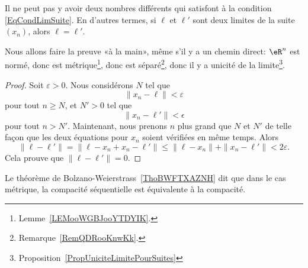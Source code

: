 \begin{lemma}
	Il ne peut pas y avoir deux nombres différents qui satisfont à la condition \eqref{EqCondLimSuite}. En d'autres termes, si $\ell$ et $\ell'$ sont deux limites de la suite $(x_n)$, alors $\ell=\ell'$.
\end{lemma}
Nous allons faire la preuve «à la main», même s'il y a un chemin direct: $\eR^n$ est normé, donc est métrique\footnote{Lemme~\ref{LEMooWGBJooYTDYIK}.}, donc est séparé\footnote{Remarque~\ref{RemQDRooKnwKk}.}, donc il y a unicité de la limite\footnote{Proposition~\ref{PropUniciteLimitePourSuites}}.
\begin{proof}
	Soit $\varepsilon>0$. Nous considérons $N$ tel que
	\begin{equation}
		\| x_n-\ell \|<\varepsilon
	\end{equation}
	pour tout $n\geq N$, et $N'>0$ tel que
	\begin{equation}
		\| x_n-\ell' \|<\epsilon
	\end{equation}
	pour tout $n>N'$. Maintenant, nous prenons $n$ plus grand que $N$ et $N'$ de telle façon que les deux équations pour $x_n$ soient vérifiées en même temps. Alors
	\begin{equation}
		\| \ell-\ell' \|=\| \ell-x_n+x_n-\ell' \|\leq\| \ell-x_n \|+\| x_n-\ell' \|<2\varepsilon.
	\end{equation}
	Cela prouve que $\| \ell-\ell' \|=0$.
\end{proof}
Le théorème de Bolzano-Weierstrass~\ref{ThoBWFTXAZNH} dit que dans le cas métrique, la compacité séquentielle est équivalente à la compacité.

